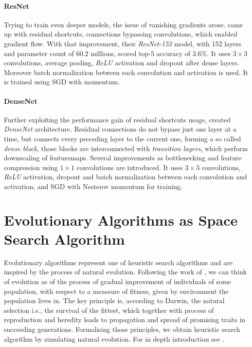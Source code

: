 \paragraph{ResNet}
Trying to train even deeper models, the issue of vanishing gradients arose. \cite{DBLP:journals/corr/HeZRS15} came up with residual shortcuts, connections bypassing convolutions, which enabled gradient flow. With that improvement, their \emph{ResNet-152} model, with 152 layers and parameter count of $60.2$ millions, scored top-5 accuracy of $3.6\%$. It uses $3 \times 3$ convolutions, average pooling, \emph{ReLU} activation and dropout after dense layers. Moreover batch normalization between each convolution and activation is used. It is trained using SGD with momentum.

\paragraph{DenseNet}
Further exploiting the performance gain of residual shortcuts usage, \cite{DBLP:journals/corr/HuangLW16a} created \emph{DenseNet} architecture. Residual connections do not bypass just one layer at a time, but connects every preceding layer to the current one, forming a so called \emph{dense block}, those blocks are interconnected with \emph{transition layers}, which perform downscaling of featuremaps. Several improvements as bottlenecking and feature compression using $1 \times 1$ convolutions are introduced. It uses $3 \times 3$ convolutions, \emph{ReLU} activation, dropout and batch normalization between each convolution and activation, and SGD with Nesterov momentum for training.

\section{Evolutionary Algorithms as Space Search Algorithm}
Evolutionary algorithms represent one of heuristic search algorithms and are inspired by the process of natural evolution. Following the work of \cite{darwin1859}, we can think of evolution as of the process of gradual improvement of individuals of some population, with respect to a meassure of fitness, given by environment the population lives in. The key principle is, according to Darwin, the natural selection i.e., the survival of the fittest, which together with process of reproduction and heredity leads to propagation and spread of promising traits in succeeding generations. Formalising those principles, we obtain heuristic search algorithm by simulating natural evolution. For in depth introduction see \cite{evolution}.

